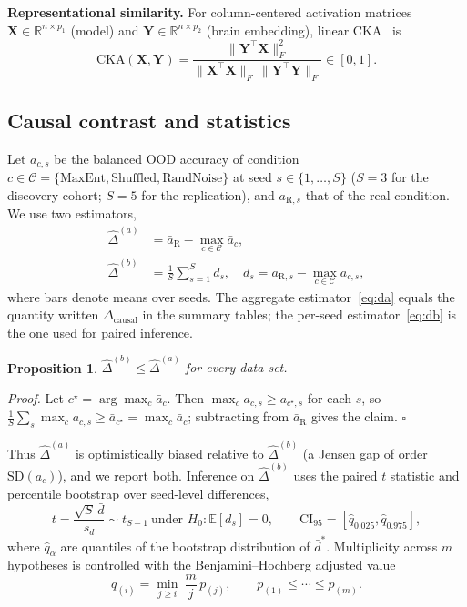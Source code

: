 \documentclass[conference]{IEEEtran}
\newtheorem{proposition}{Proposition}
\newcommand{\dcausal}{\Delta_{\mathrm{causal}}}
\newcommand{\E}{\mathbb{E}}
\begin{document}
\textbf{Representational similarity.} For column-centered activation matrices $\mathbf X\in\mathbb R^{n\times p_1}$ (model) and $\mathbf Y\in\mathbb R^{n\times p_2}$ (brain embedding), linear CKA~\cite{kornblith2019cka} is
\begin{equation}
  \mathrm{CKA}(\mathbf X,\mathbf Y)=\frac{\|\mathbf Y^\top\mathbf X\|_F^2}{\|\mathbf X^\top\mathbf X\|_F\,\|\mathbf Y^\top\mathbf Y\|_F}\in[0,1].
\end{equation}

\subsection{Causal contrast and statistics}\label{sec:stats}
Let $a_{c,s}$ be the balanced OOD accuracy of condition $c\in\mathcal C=\{\text{MaxEnt},\text{Shuffled},\text{RandNoise}\}$ at seed $s\in\{1,\dots,S\}$ ($S=3$ for the discovery cohort; $S=5$ for the replication), and $a_{\mathrm{R},s}$ that of the real condition. We use two estimators,
\begin{align}
  \hat\Delta^{(a)}&=\bar a_{\mathrm R}-\max_{c\in\mathcal C}\bar a_{c},\label{eq:da}\\
  \hat\Delta^{(b)}&=\frac1S\sum_{s=1}^{S}d_s,\quad d_s=a_{\mathrm R,s}-\max_{c\in\mathcal C}a_{c,s},\label{eq:db}
\end{align}
where bars denote means over seeds. The aggregate estimator~\eqref{eq:da} equals the quantity written $\dcausal$ in the summary tables; the per-seed estimator~\eqref{eq:db} is the one used for paired inference.
\begin{proposition}\label{prop:order}
$\hat\Delta^{(b)}\le\hat\Delta^{(a)}$ for every data set.
\end{proposition}
\emph{Proof.} Let $c^\star=\arg\max_c\bar a_c$. Then $\max_c a_{c,s}\ge a_{c^\star,s}$ for each $s$, so $\tfrac1S\sum_s\max_c a_{c,s}\ge\bar a_{c^\star}=\max_c\bar a_c$; subtracting from $\bar a_{\mathrm R}$ gives the claim. $\square$

Thus $\hat\Delta^{(a)}$ is optimistically biased relative to $\hat\Delta^{(b)}$ (a Jensen gap of order $\mathrm{SD}(a_c)$), and we report both. Inference on $\hat\Delta^{(b)}$ uses the paired $t$ statistic and percentile bootstrap over seed-level differences,
\begin{equation}
  t=\frac{\sqrt S\,\bar d}{s_d}\sim t_{S-1}\ \text{under }H_0\!:\E[d_s]=0,\qquad \mathrm{CI}_{95}=[\hat q_{0.025},\hat q_{0.975}],\label{eq:t}
\end{equation}
where $\hat q_\alpha$ are quantiles of the bootstrap distribution of $\bar d^{*}$. Multiplicity across $m$ hypotheses is controlled with the Benjamini--Hochberg adjusted value~\cite{benjamini1995fdr}
\begin{equation}
  q_{(i)}=\min_{j\ge i}\ \frac{m}{j}\,p_{(j)},\qquad p_{(1)}\le\cdots\le p_{(m)}.
\end{equation}
\end{document}
